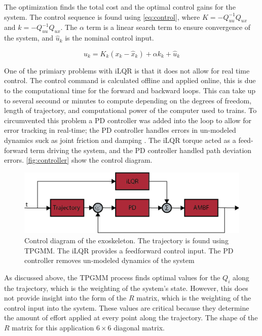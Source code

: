 The optimization finds the total cost and the optimal control gains for the system. The control sequence is found using \autoref{eq:control}, where $K=-Q_{uu}^{-1}Q_{ux}$ and $k=-Q^{-1}_{uu} Q_{ux}$. The $\alpha$ term is a linear search term to ensure convergence of the system, and $\hat{u}_k$ is the nominal control input. 


\begin{equation}
    u_k = K_k (x_k - \hat{x}_k) + \alpha k_k + \hat{u}_k
    \label{eq:control}
\end{equation}

One of the primiary problems with iLQR is that it does not allow for real time control. The control command is calculated offline and applied online, this is due to the computational time for the forward and backward loops. This can take up to several secound or minutes to compute depending on the degrees of freedom, length of trajectory, and computational power of the computer used to trains. To circumvented this problem a PD controller was added into the loop to allow for error tracking in real-time; the PD controller handles errors in un-modeled dynamics suck as joint friction and damping \cite{iLQR_tassa2014}. The iLQR torque acted as a feed-forward term driving the system, and the PD controller handled path deviation errors. \autoref{fig:controller} show the control diagram. 

\begin{figure}[H]
    \centering
    \includegraphics[width=\linewidth]{images/controllers/iLQR.png}
    \caption[iLQR Control Diagram]{Control diagram of the exoskeleton. The trajectory is found using TPGMM. The iLQR provides a feedforward control input. The PD controller removes un-modeled dynamics of the system }
    \label{fig:controller}
\end{figure}

As discussed above, the TPGMM process finds optimal values for the $Q_i$ along the trajectory, which is the weighting of the system's state. However, this does not provide insight into the form of the $R$ matrix, which is the weighting of the control input into the system. These values are critical because they determine the amount of effort applied at every point along the trajectory. The shape of the $R$ matrix for this application  $6 \times 6$ diagonal matrix.


